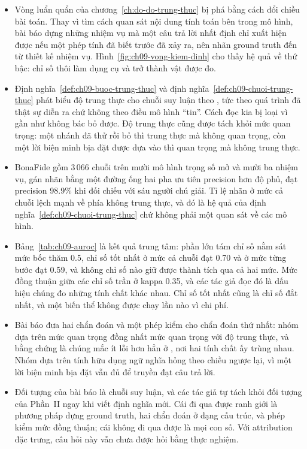 \begin{tomtat}
\begin{itemize}
  \item Vòng luẩn quẩn của chương~\ref{ch:do-do-trung-thuc} bị phá bằng cách
  đổi chiều bài toán. Thay vì tìm cách quan sát nội dung tính toán bên trong
  mô hình, bài báo dựng những nhiệm vụ mà một câu trả lời nhất định chỉ xuất
  hiện được nếu một phép tính đã biết trước đã xảy ra, nên nhãn ground truth
  đến từ thiết kế nhiệm vụ. Hình~\ref{fig:ch09-vong-kiem-dinh} cho thấy hệ quả về thứ
  bậc: chỉ số thôi làm dụng cụ và trở thành vật được đo.
  \item Định nghĩa~\ref{def:ch09-buoc-trung-thuc} và
  định nghĩa~\ref{def:ch09-chuoi-trung-thuc} phát biểu độ trung thực cho chuỗi
  suy luận theo , tức theo quá trình
  đã thật sự diễn ra chứ
  không theo điều mô hình \enquote{tin}. Cách đọc kia bị loại vì gần như không
  bác bỏ được. Độ trung thực cũng được tách khỏi mức quan trọng: một nhánh đã
  thử rồi bỏ thì trung thực mà
  không quan trọng, còn một lời biện minh bịa đặt được dựa vào thì quan trọng
  mà không trung thực.
  \item BonaFide gồm 3\,066 chuỗi trên mười mô hình trọng số mở và mười ba
  nhiệm vụ, gán nhãn bằng một đường ống hai pha ưu tiên precision hơn độ
  phủ, đạt precision 98.9\% khi đối chiếu với sáu người chú giải. Tỉ lệ
  nhãn ở mức cả chuỗi lệch mạnh về phía không trung thực, và đó là hệ quả của
  định nghĩa~\ref{def:ch09-chuoi-trung-thuc} chứ không phải một quan sát về
  các mô hình.
  \item Bảng~\ref{tab:ch09-auroc} là kết quả trung tâm: phần lớn tám chỉ số
  nằm sát mức bốc thăm 0.5, chỉ số tốt nhất ở mức cả chuỗi đạt 0.70 và ở mức
  từng bước đạt 0.59, và không chỉ số nào giữ được thành tích qua cả hai mức.
  Mức đồng thuận giữa các chỉ số trần ở kappa 0.35, và các tác giả đọc đó là
  dấu hiệu chúng đo những tính chất khác nhau. Chỉ số tốt nhất cũng là chỉ số
  đắt nhất, và một biến thể không được chạy lần nào vì chi phí.
  \item Bài báo đưa hai chẩn đoán và một phép kiểm cho chẩn đoán thứ nhất:
  nhóm dựa trên mức quan trọng đồng nhất mức quan trọng với độ trung thực, và
  bằng chứng là chúng mắc ít lỗi hơn hẳn ở
  , nơi hai tính
  chất ấy trùng nhau. Nhóm dựa trên tính hữu dụng ngữ nghĩa hỏng theo chiều
  ngược lại, vì một lời biện minh bịa đặt vẫn đủ để truyền đạt câu trả lời.
  \item Đối tượng của bài báo là chuỗi suy luận, và các tác giả tự tách khỏi
  đối tượng của Phần~II ngay khi viết định nghĩa mới. Cái đi qua được ranh giới
  là phương pháp dựng ground truth, hai chẩn đoán ở dạng cấu trúc, và phép kiểm
  mức đồng thuận; cái không đi qua được là mọi con số. Với attribution đặc
  trưng, câu hỏi này vẫn chưa được hỏi bằng thực nghiệm.
\end{itemize}
\end{tomtat}

